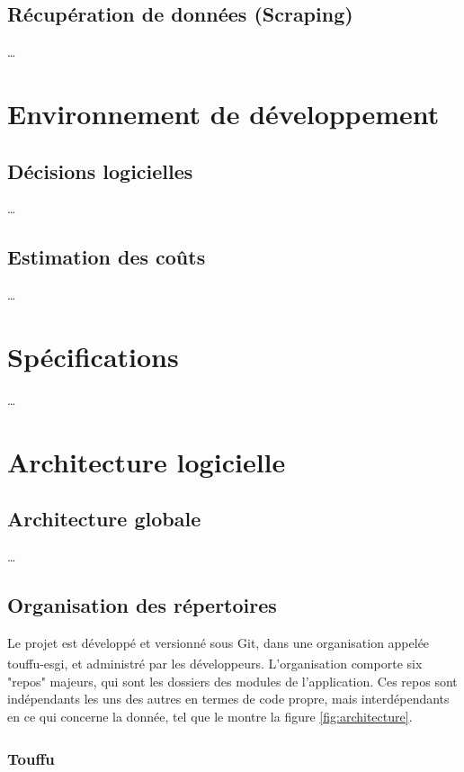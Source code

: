 \documentclass[conference]{IEEEtran}
\newcommand{\bibRef}[1]
{\textsuperscript{\cite{#1}}}
\begin{document}
\subsection{Récupération de données (Scraping)}
…

\section{Environnement de développement}

\subsection{Décisions logicielles}
…

\subsection{Estimation des coûts}
…

\section{Spécifications}
…

\section{Architecture logicielle}

\subsection{Architecture globale}

…

\subsection{Organisation des répertoires}

Le projet est développé et versionné sous Git, dans une organisation appelée touffu-esgi\bibRef{touffu-esgi}, et administré par les développeurs. L'organisation comporte six "repos" majeurs, qui sont les dossiers des modules de l'application. Ces repos sont indépendants les uns des autres en termes de code propre, mais interdépendants en ce qui concerne la donnée, tel que le montre la figure \ref{fig:architecture}.\\

\subsubsection*{Touffu\bibRef{Touffu} }
\end{document}
